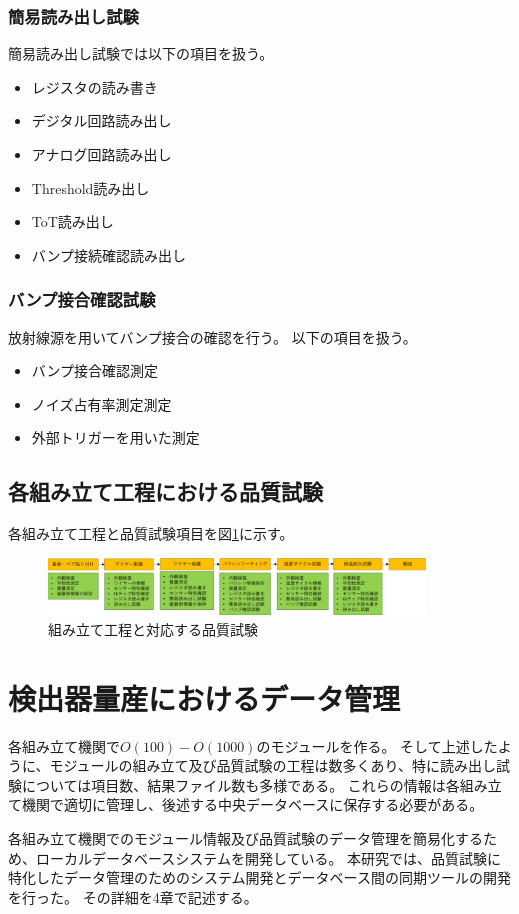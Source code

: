 \subsubsection{簡易読み出し試験}
簡易読み出し試験では以下の項目を扱う。
\begin{itemize}
  \item レジスタの読み書き
  \item デジタル回路読み出し
  \item アナログ回路読み出し
  \item Threshold読み出し
  \item ToT読み出し
  \item バンプ接続確認読み出し
\end{itemize}

\subsubsection{バンプ接合確認試験}
放射線源を用いてバンプ接合の確認を行う。
以下の項目を扱う。
\begin{itemize}
  \item バンプ接合確認測定
  \item ノイズ占有率測定測定
  \item 外部トリガーを用いた測定
\end{itemize}

\subsection{各組み立て工程における品質試験}

各組み立て工程と品質試験項目を図\ref{stage_test_flow}に示す。
\begin{figure}[bpt]\centering
\includegraphics[width=10cm]{stage_test_flow}
\caption[組み立て工程と対応する品質試験]{組み立て工程と対応する品質試験}
\label{stage_test_flow}
\end{figure}

\section{検出器量産におけるデータ管理}
各組み立て機関で$O(100)-O(1000)$のモジュールを作る。
そして上述したように、モジュールの組み立て及び品質試験の工程は数多くあり、特に読み出し試験については項目数、結果ファイル数も多様である。
これらの情報は各組み立て機関で適切に管理し、後述する中央データベースに保存する必要がある。

各組み立て機関でのモジュール情報及び品質試験のデータ管理を簡易化するため、ローカルデータベースシステムを開発している。
本研究では、品質試験に特化したデータ管理のためのシステム開発とデータベース間の同期ツールの開発を行った。
その詳細を4章で記述する。



